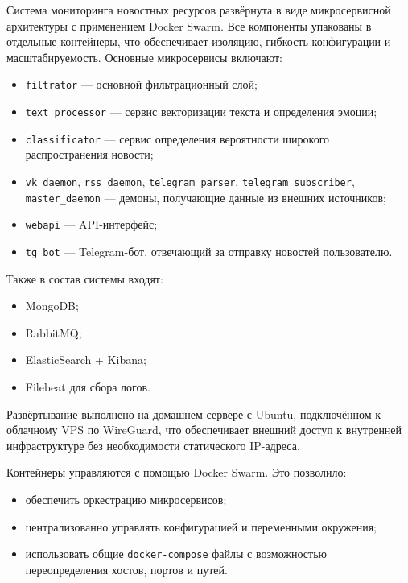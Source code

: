 \newpage


Система мониторинга новостных ресурсов развёрнута в виде микросервисной архитектуры с применением Docker Swarm.
Все компоненты упакованы в отдельные контейнеры, что обеспечивает изоляцию, гибкость конфигурации и масштабируемость.
Основные микросервисы включают:
\begin{itemize}
  \item \texttt{filtrator} — основной фильтрационный слой;
  \item \texttt{text\_processor} — сервис векторизации текста и определения эмоции;
  \item \texttt{classificator} — сервис определения вероятности широкого распространения новости;
  \item \texttt{vk\_daemon}, \texttt{rss\_daemon}, \texttt{telegram\_parser}, \texttt{telegram\_subscriber}, \texttt{master\_daemon} — демоны, получающие данные из внешних источников;
  \item \texttt{webapi} — API-интерфейс;
  \item \texttt{tg\_bot} — Telegram-бот, отвечающий за отправку новостей пользователю.
\end{itemize}

Также в состав системы входят:
\begin{itemize}
  \item MongoDB;
  \item RabbitMQ;
  \item ElasticSearch + Kibana;
  \item Filebeat для сбора логов.
\end{itemize}

Развёртывание выполнено на домашнем сервере с Ubuntu, подключённом к облачному VPS по WireGuard, что обеспечивает внешний доступ к внутренней инфраструктуре без необходимости статического IP-адреса.

Контейнеры управляются с помощью Docker Swarm.
Это позволило:
\begin{itemize}
  \item обеспечить оркестрацию микросервисов;
  \item централизованно управлять конфигурацией и переменными окружения;
  \item использовать общие \texttt{docker-compose} файлы с возможностью переопределения хостов, портов и путей.
\end{itemize}

